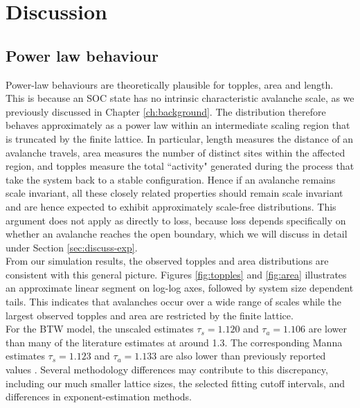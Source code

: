 \chapter{Discussion}\label{ch:discussion}

\section{Power law behaviour}\label{sec:discuss-powerlaw}

Power-law behaviours are theoretically plausible for topples, area and length. This is because an SOC state has no intrinsic characteristic avalanche scale, as we previously discussed in Chapter \ref{ch:background}. The distribution therefore behaves approximately as a power law within an intermediate scaling region that is truncated by the finite lattice. In particular, length measures the distance of an avalanche travels, area measures the number of distinct sites within the affected region, and topples measure the total ``activity" generated during the process that take the system back to a stable configuration. Hence if an avalanche remains scale invariant, all these closely related properties should remain scale invariant and are hence expected to exhibit approximately scale-free distributions. This argument does not apply as directly to loss, because loss depends specifically on whether an avalanche reaches the open boundary, which we will discuss in detail under Section \ref{sec:discuss-exp}.\\

From our simulation results, the observed topples and area distributions are consistent with this general picture. Figures \ref{fig:topples} and \ref{fig:area} illustrates an approximate linear segment on log-log axes, followed by system size dependent tails. This indicates that avalanches occur over a wide range of scales while the largest observed topples and area are restricted by the finite lattice. \\

For the BTW model, the unscaled estimates $\tau_s=1.120$ and $\tau_a=1.106$ are lower than many of the literature estimates at around 1.3. The corresponding Manna estimates $\tau_s=1.123$ and $\tau_a=1.133$ are also lower than previously reported values \cite{Lubeck1997Numerical}. Several methodology differences may contribute to this discrepancy, including our much smaller lattice sizes, the selected fitting cutoff intervals, and differences in exponent-estimation methods. \\

